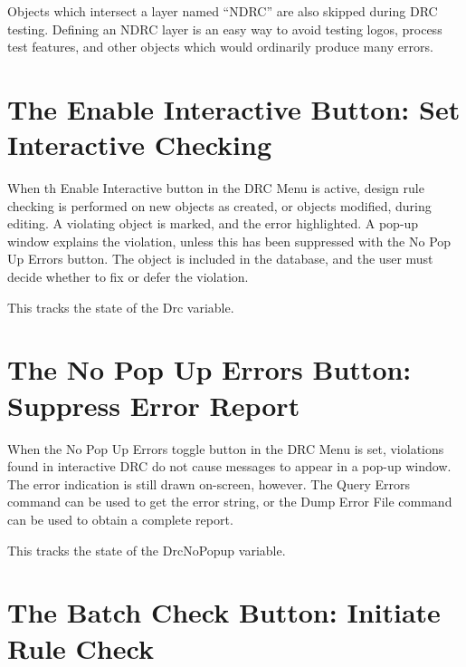 Objects which intersect a layer named ``NDRC'' are also skipped during
DRC testing.  Defining an NDRC layer is an easy way to avoid testing
logos, process test features, and other objects which would ordinarily
produce many errors.


\section{The {\cb Enable Interactive} Button: Set Interactive Checking}
When th {\cb Enable Interactive} button in the {\cb DRC Menu} is
active, design rule checking is performed on new objects as created,
or objects modified, during editing.  A violating object is marked,
and the error highlighted.  A pop-up window explains the violation,
unless this has been suppressed with the {\cb No Pop Up Errors}
button.  The object is included in the database, and the user must
decide whether to fix or defer the violation.

This tracks the state of the {\et Drc} variable.


\section{The {\cb No Pop Up Errors} Button: Suppress Error Report}
When the {\cb No Pop Up Errors} toggle button in the {\cb DRC Menu} is
set, violations found in interactive DRC do not cause messages to
appear in a pop-up window.  The error indication is still drawn
on-screen, however.  The {\cb Query Errors} command can be used to get
the error string, or the {\cb Dump Error File} command can be used to
obtain a complete report.

This tracks the state of the {\et DrcNoPopup} variable.


\section{The {\cb Batch Check} Button:  Initiate Rule Check}

